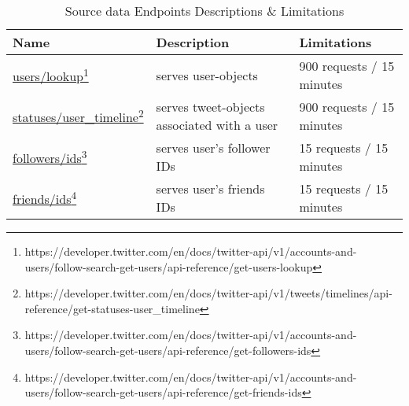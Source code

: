 \begin{table}[ht]
	\centering
	\begin{tabular}{ | p{4.2cm} | p{5.7cm} | p{2.6cm} | }
		\hline \textbf{Name}  & \textbf{Description}   & \textbf{Limitations} \\
		\hline
		\hline \href{https://developer.twitter.com/en/docs/twitter-api/v1/accounts-and-users/follow-search-get-users/api-reference/get-users-lookup}{users/lookup}\footnote{https://developer.twitter.com/en/docs/twitter-api/v1/accounts-and-users/follow-search-get-users/api-reference/get-users-lookup} & serves \glspl{user-object} & 900 requests / 15 minutes \\
		\hline \href{https://developer.twitter.com/en/docs/twitter-api/v1/tweets/timelines/api-reference/get-statuses-user_timeline}{statuses/user\_timeline}\footnote{https://developer.twitter.com/en/docs/twitter-api/v1/tweets/timelines/api-reference/get-statuses-user\_timeline} & serves \glspl{tweet-object} associated with a user & 900 requests / 15 minutes \\
		\hline \href{https://developer.twitter.com/en/docs/twitter-api/v1/accounts-and-users/follow-search-get-users/api-reference/get-followers-ids}{followers/ids}\footnote{https://developer.twitter.com/en/docs/twitter-api/v1/accounts-and-users/follow-search-get-users/api-reference/get-followers-ids} & serves user's follower IDs  & 15 requests / 15 minutes \\
		\hline \href{https://developer.twitter.com/en/docs/twitter-api/v1/accounts-and-users/follow-search-get-users/api-reference/get-friends-ids}{friends/ids}\footnote{https://developer.twitter.com/en/docs/twitter-api/v1/accounts-and-users/follow-search-get-users/api-reference/get-friends-ids} & serves user's friends IDs & 15 requests / 15 minutes \\
		\hline

	\end{tabular}
    \caption{Source data Endpoints Descriptions \& Limitations}
\end{table}
\label{tables:source-endpoints-limitations}